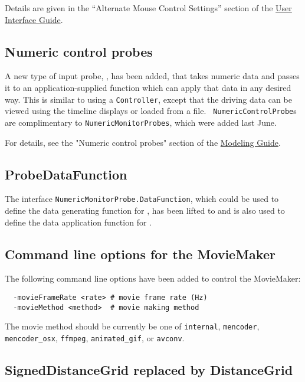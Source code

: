 \documentclass{article}
\begin{document}
Details are given in the ``Alternate Mouse Control Settings'' section
of the \href{http://www.artisynth.org/doc/html/uiguide/uiguide.html}
{User Interface Guide}.

\subsection*{Numeric control probes}

A new type of input probe,
, has been
added, that takes numeric data and passes it to an application-supplied
function which can apply that data in any desired way.  This is
similar to using a {\tt Controller}, except that the driving data can
be viewed using the timeline displays or loaded from a file.  {\tt
NumericControlProbe}s are complimentary to {\tt NumericMonitorProbes},
which were added last June.

For details, see the "Numeric control probes"
section of the 
\href{http://www.artisynth.org/doc/html/modelguide/modelguide.html}
{Modeling Guide}.

\subsection*{ProbeDataFunction}

The interface {\tt NumericMonitorProbe.DataFunction}, which could be
used to define the data generating function for 
,
has been lifted to
 and
is also used to define the data application function
for .

\subsection*{Command line options for the MovieMaker}

The following command line options have been added to control the
MovieMaker:

\begin{verbatim}
  -movieFrameRate <rate> # movie frame rate (Hz)
  -movieMethod <method>  # movie making method
\end{verbatim}

The movie method should be currently be one of {\tt internal},
{\tt mencoder}, {\tt mencoder\_osx}, {\tt ffmpeg}, {\tt animated\_gif},
or {\tt avconv}.

\subsection*{SignedDistanceGrid replaced by DistanceGrid}
\end{document}
